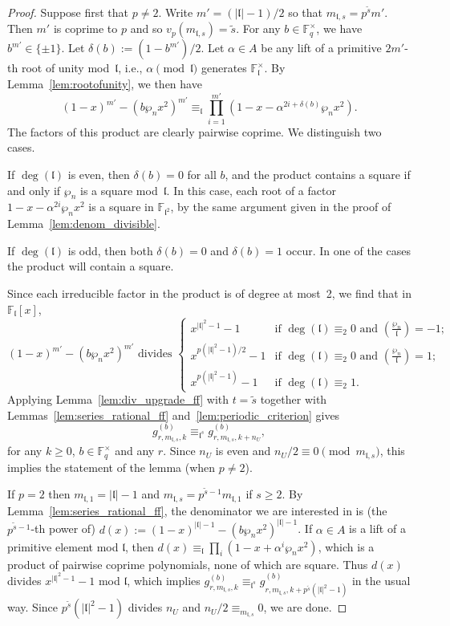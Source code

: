 \documentclass[10pt]{article}
\theoremstyle{definition}
\renewcommand{\:}{\colon}
\newcommand{\bF}{\mathbb{F}}
\renewcommand{\l}{\mathfrak{l}}
\begin{document}
\begin{proof} 
    Suppose first that $p \neq 2$. Write $m' = (|\l|-1)/2$ so that $m_{\l,s} = p^{\tilde{s}} m'$. Then $m'$ is coprime to $p$ and so $v_p(m_{\l,s}) = \tilde{s}$. For any $b \in \bF_q^\times$, we have $b^{m'} \in \{\pm 1\}$. Let $\delta(b) := (1-b^{m'})/2$. Let $\alpha \in A$ be any lift of a primitive $2m'$-th root of unity mod~$\l$, i.e., $\alpha \pmod{\l}$ generates $\bF_{\l}^\times$. By Lemma~\ref{lem:rootofunity}, we then have
    \[
    (1-x)^{m'} - (b\wp_nx^2)^{m'} \equiv_{\l} \prod_{i=1}^{m'} (1 - x - \alpha^{2i+\delta(b)} \wp_n x^2).
    \]
    The factors of this product are clearly pairwise coprime. We distinguish two cases.
    
    If $\deg(\l)$ is even, then $\delta(b) = 0$ for all $b$, and the product contains a square if and only if $\wp_n$ is a square mod~$\l$. In this case, each root of a factor $1-x-\alpha^{2i}\wp_nx^2$ is a square in $\bF_{\l^2}$, by the same argument given in the proof of Lemma~\ref{lem:denom_divisible}.
    
    If $\deg(\l)$ is odd, then both $\delta(b) = 0$ and $\delta(b) = 1$ occur. In one of the cases the product will contain a square.
    
    Since each irreducible factor in the product is of degree at most~2, we find that in $\bF_{\l}[x]$,
    \[
    (1-x)^{m'} - (b\wp_nx^2)^{m'} \text{ divides } \begin{cases}
        x^{|\l|^2-1} - 1 & \text{if } \deg(\l) \equiv_2 0 \text{ and } \left( \frac{\wp_n}{\l} \right) = -1; \\
        x^{p(|\l|^2-1)/2} -1 & \text{if } \deg(\l) \equiv_2 0 \text{ and } \left( \frac{\wp_n}{\l} \right) = 1; \\
        x^{p(|\l|^2-1)} - 1 &  \text{if } \deg(\l) \equiv_2 1.
    \end{cases}
    \]
    Applying Lemma~\ref{lem:div_upgrade_ff} with $t = \tilde{s}$ together with Lemmas~\ref{lem:series_rational_ff} and~\ref{lem:periodic_criterion} gives
    \[
    g^{(b)}_{r,m_{\l,s},k} \equiv_{\l^s} g^{(b)}_{r,m_{\l,s},k+n_U},
    \]
    for any $k \geq 0$, $b \in \mathbb F_q^\times$ and any $r$.  Since $n_U$ is even and $n_U/2 \equiv 0 \pmod{m_{\l,s}}$, this implies the statement of the lemma (when $p \neq 2$).

    If $p=2$ then $m_{\l,1} = |\l|-1$ and $m_{\l,s} = p^{\tilde{s}-1}m_{\l,1}$ if $s \geq 2$. By Lemma~\ref{lem:series_rational_ff}, the denominator we are interested in is (the $p^{\tilde{s}-1}$-th power of) $d(x) := (1-x)^{|\l|-1}-(b\wp_n x^2)^{|\l|-1}$.
    If $\alpha \in A$ is a lift of a primitive element mod $\l$, then $d(x) \equiv_{\l} \prod_i (1-x+\alpha^i \wp_n x^2)$, which is a product of pairwise coprime polynomials, none of which are square. Thus $d(x)$ divides $x^{|\l|^2-1}-1$ mod $\l$, which implies $g^{(b)}_{r,m_{\l,s},k} \equiv_{\l^s} g^{(b)}_{r,m_{\l,s},k+p^{\tilde{s}}(|\l|^2-1)}$ in the usual way.
    Since $p^{\tilde{s}}(|\l|^2-1)$ divides $n_U$ and $n_U/2 \equiv_{m_{\l,s}} 0$, we are done.
\end{proof}
\end{document}
